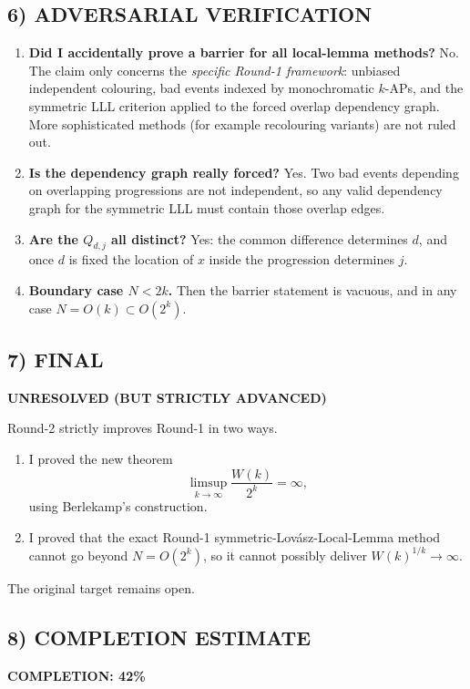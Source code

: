 \subsection*{6) ADVERSARIAL VERIFICATION}
\begin{enumerate}
\item \textbf{Did I accidentally prove a barrier for all local-lemma methods?}  No.  The claim only concerns the \emph{specific Round-1 framework}: unbiased independent colouring, bad events indexed by monochromatic $k$-APs, and the symmetric LLL criterion applied to the forced overlap dependency graph.  More sophisticated methods (for example recolouring variants) are not ruled out.

\item \textbf{Is the dependency graph really forced?}  Yes.  Two bad events depending on overlapping progressions are not independent, so any valid dependency graph for the symmetric LLL must contain those overlap edges.

\item \textbf{Are the $Q_{d,j}$ all distinct?}  Yes: the common difference determines $d$, and once $d$ is fixed the location of $x$ inside the progression determines $j$.

\item \textbf{Boundary case $N<2k$.}  Then the barrier statement is vacuous, and in any case $N=O(k)\subset O(2^k)$.
\end{enumerate}

\subsection*{7) FINAL}
\textbf{UNRESOLVED (BUT STRICTLY ADVANCED)}

Round-2 strictly improves Round-1 in two ways.
\begin{enumerate}
\item I proved the new theorem
\[
\limsup_{k\to\infty} \frac{W(k)}{2^k}=\infty,
\]
using Berlekamp's construction.
\item I proved that the exact Round-1 symmetric-Lov\'asz-Local-Lemma method cannot go beyond $N=O(2^k)$, so it cannot possibly deliver $W(k)^{1/k}\to\infty$.
\end{enumerate}
The original target remains open.

\subsection*{8) COMPLETION ESTIMATE}
\textbf{COMPLETION: 42\%}

